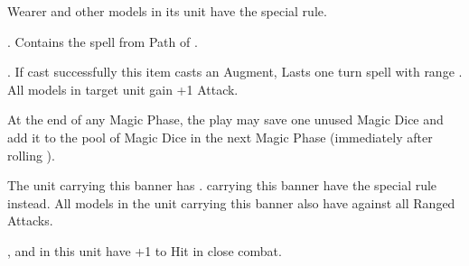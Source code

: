 \armyenchanteditems

\startpricelist

 Wearer and other \rnf{} models in its unit have the \distracting{} special rule.

\endpricelist

\armyarcaneitems

\startpricelist

 . Contains the spell \necromancyspelltwo{} from Path of \necromancy .

 . If cast successfully this item
casts an Augment, Lasts one turn spell with range . All \undead{} models in target unit gain +1 Attack.

 At the end of any Magic Phase, the play may save one unused Magic Dice and add it to the pool of Magic Dice in the next Magic Phase (immediately after rolling ).

\endpricelist

\armymagicalbanners

\startpricelist

 The unit carrying this banner has \bodyguard{\vampirelord , \vampirehero}. \vampireknights{} carrying this banner have the \stubborn{} special rule instead. All models in the unit carrying this banner also have  against all Ranged Attacks.

 \barrowknights , \barrowguards{} and \barrowkings{} in this unit have +1 to Hit in close combat.

\endpricelist

\closearmymagicalitems








\quickrefsheettitle


\bigskip
\noindent\begin{center}\Large{\textbf{}}\end{center}
\medskip

\newcommand{\QRSinvoctable}[2]{%
\rowcolors{1}{white}{black!10}
\noindent\begin{tabular}{p{3cm}@{}>{\centering\let\newline\\\arraybackslash\hspace{0pt}}p{1cm}@{}}%
\antiquefont\Large{\textbf{#1\spacebeforecolon{}:}}&\vspace*{-0.2cm}%
\DTLforeach*[#2]{profiles}{\rowname=name, \rowtrooptype=trooptype, \rowcategory=category, \rowinvocation=invocation}{%
\tabularnewline\rowname{} & \rowinvocation{}}%
\tabularnewline%
\end{tabular}
\medskip
}


